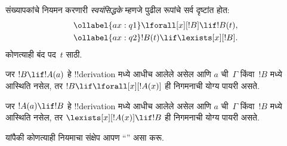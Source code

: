 \documentclass[../../../include/open-logic-section]{subfiles}
\begin{document}


\begin{defn}[संख्यापकांसाठी स्वयंसिद्धके]
संख्यापकांचे नियमन करणारी \emph{स्वयंसिद्धके} म्हणजे पुढील रूपांचे सर्व
दृष्टांत होत:
\begin{align}
\ollabel{ax:q1} & \lforall[x][!B] \lif !B(t), \\
\ollabel{ax:q2} & !B(t) \lif \lexists[x][!B].
\end{align}
कोणत्याही बंद पद~$t$ साठी.
\end{defn}

\begin{defn}[संख्यापकांसाठी नियम]
\item जर $!B \lif !A(a)$ हे !!{derivation} मध्ये आधीच आलेले असेल आणि
  $a$ ची~$\Gamma$ किंवा~$!B$ मध्ये आस्थिति नसेल, तर $!B \lif
  \lforall[x][!A(x)]$ ही निगमनाची योग्य पायरी असते.
\item जर $!A(a) \lif !B$ हे !!{derivation} मध्ये आधीच आलेले असेल आणि
  $a$ ची~$\Gamma$ किंवा~$!B$ मध्ये आस्थिति नसेल, तर
  $\lexists[x][!A(x)] \lif !B$ ही निगमनाची योग्य पायरी असते.
\end{defn}

यांपैकी कोणत्याही नियमाचा संक्षेप आपण ``\QR'' असा करू.
\end{document}
